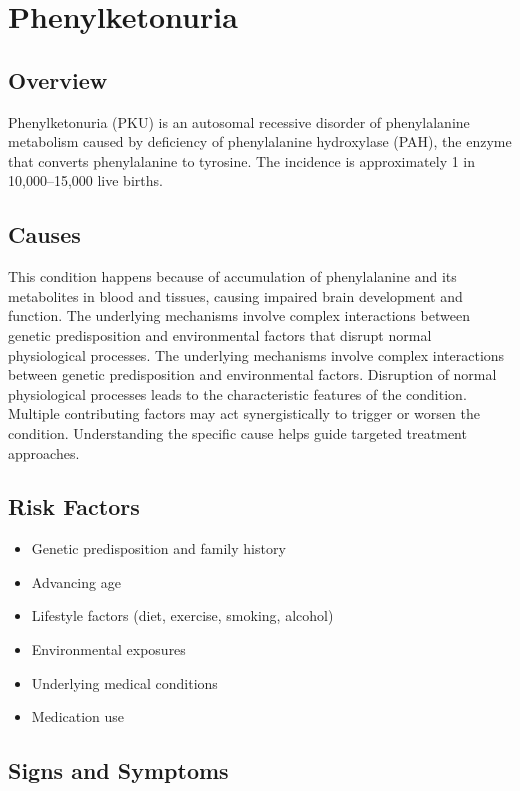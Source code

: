 \chapter{Phenylketonuria}
\label{sec:Phenylketonuria}

\section{Overview}
Phenylketonuria (PKU) is an autosomal recessive disorder of phenylalanine metabolism caused by deficiency of phenylalanine hydroxylase (PAH), the enzyme that converts phenylalanine to tyrosine. The incidence is approximately 1 in 10,000--15,000 live births.
\section{Causes}
This condition happens because of accumulation of phenylalanine and its metabolites in blood and tissues, causing impaired brain development and function. The underlying mechanisms involve complex interactions between genetic predisposition and environmental factors that disrupt normal physiological processes. The underlying mechanisms involve complex interactions between genetic predisposition and environmental factors. Disruption of normal physiological processes leads to the characteristic features of the condition. Multiple contributing factors may act synergistically to trigger or worsen the condition. Understanding the specific cause helps guide targeted treatment approaches.
\section{Risk Factors}


\begin{itemize}[noitemsep]
  \item Genetic predisposition and family history
  \item Advancing age
  \item Lifestyle factors (diet, exercise, smoking, alcohol)
  \item Environmental exposures
  \item Underlying medical conditions
  \item Medication use
\end{itemize}
\section{Signs and Symptoms}

